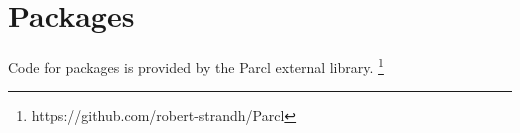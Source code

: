 \chapter{Packages}
\label{chap-packages}

Code for packages is provided by the Parcl external library.%
\footnote{https://github.com/robert-strandh/Parcl}

